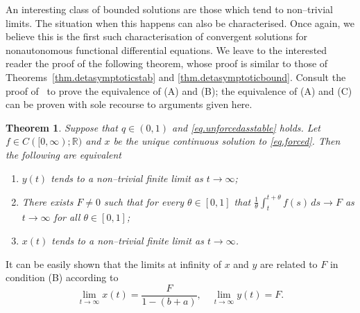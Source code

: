 \documentclass[a4paper,10pt,reqno]{amsart}
\numberwithin{equation}{section}
\newtheorem{theorem}{Theorem}
\theoremstyle{definition}
\theoremstyle{remark}
\DeclareMathOperator{\1}{\mathbbm 1}
\begin{document}
An interesting class of bounded solutions are those which tend to non--trivial limits. The situation when this happens can also be characterised. Once again, we believe this is the first such characterisation of convergent solutions for nonautonomous functional differential equations.  We leave to the interested reader the proof of the following theorem, whose proof is similar to those of Theorems~\ref{thm.detasymptoticstab} and \ref{thm.detasymptoticbound}. Consult the proof of~\cite[Lemma 15.9.2]{GLS} to prove the equivalence of (A) and (B); the equivalence of (A) and (C) can be proven with sole recourse to arguments given here.

\begin{theorem}\label{thm.detasymptoticlimit}
	Suppose that $q\in (0,1)$ and \eqref{eq.unforcedasstable} holds. Let $f\in C([0,\infty);\mathbb{R})$ and $x$ be the unique continuous solution to  \eqref{eq.forced}. Then the following are equivalent
	\begin{enumerate}
		\item[(A)] $y(t)$ tends to a non--trivial finite limit as $t\to\infty$;
		\item[(B)] There exists $F\neq 0$ such that for every $\theta\in [0,1]$ that $\frac{1}{\theta}\int_t^{t+\theta} f(s)\,ds\to F$ as $t\to\infty$ for all $\theta\in [0,1]$;
		\item[(C)] $x(t)$ tends to a non--trivial finite limit as $t\to\infty$.  
	\end{enumerate}
\end{theorem}
It can be easily shown that the limits at infinity of $x$ and $y$ are related to $F$ in condition (B) according to 
\[
\lim_{t\to\infty} x(t)=\frac{F}{1-(b+a)}, \quad  \lim_{t\to\infty} y(t)=F.
\] 
%
\end{document}
